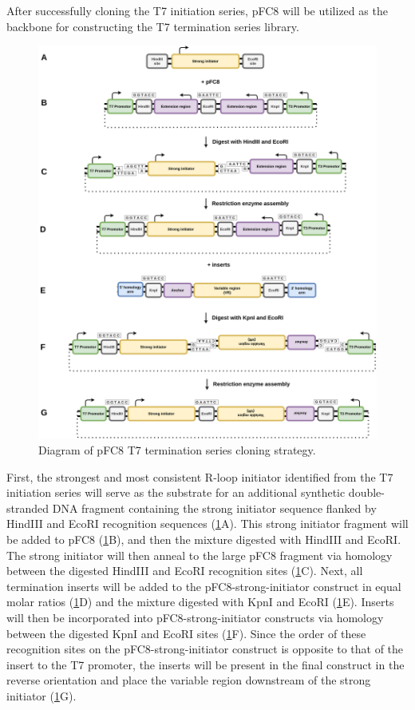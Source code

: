\documentclass[11pt]{article}
\begin{document}
After successfully cloning the T7 initiation series, pFC8 will be utilized as the backbone for constructing the T7 termination series library. 

\begin{figure}[H]
	\includegraphics[width=15cm]{images/cloning_diagrams/construct_diagrams-T7-termination-series.png}
	\centering
	\caption{Diagram of pFC8 T7 termination series cloning strategy.}
	\label{clone:T7-term}
	
\end{figure}

 First, the strongest and most consistent R-loop initiator identified from the T7 initiation series will serve as the substrate for an additional synthetic double-stranded DNA fragment containing the strong initiator sequence flanked by  HindIII and EcoRI recognition sequences (\ref{clone:T7-term}A). This strong initiator fragment will be added to pFC8  (\ref{clone:T7-term}B), and then the mixture digested with HindIII and EcoRI. The strong initiator will then anneal to the large pFC8 fragment via homology between the digested HindIII and EcoRI recognition sites (\ref{clone:T7-term}C). Next, all termination inserts will be added to the pFC8-strong-initiator construct in equal molar ratios (\ref{clone:T7-term}D) and the mixture digested with KpnI and EcoRI (\ref{clone:T7-term}E). Inserts will then be incorporated into pFC8-strong-initiator constructs via homology between the digested KpnI and EcoRI sites (\ref{clone:T7-term}F). Since the order of these recognition sites on the pFC8-strong-initiator construct is opposite to that of the insert to the T7 promoter, the inserts will be present in the final construct in the reverse orientation and place the variable region downstream of the strong initiator (\ref{clone:T7-term}G). 
 
\end{document}
